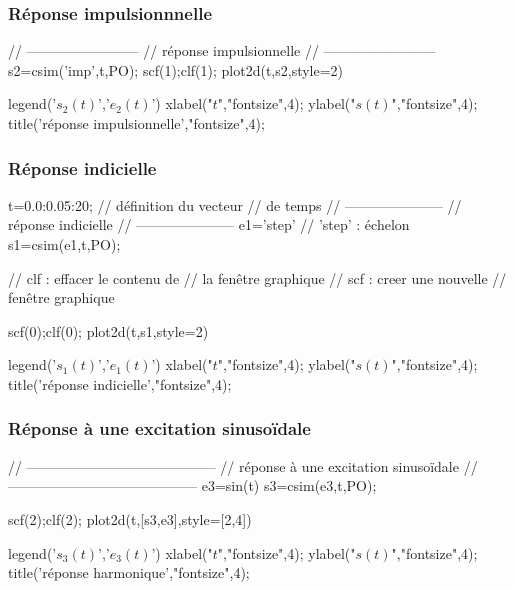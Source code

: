 \subsubsection{Réponse impulsionnnelle}
\begin{Scilabcode}
// ------------------------
// réponse impulsionnelle
// ------------------------
s2=csim('imp',t,PO);   
scf(1);clf(1);
plot2d(t,s2,style=2)

legend('$s_2(t)$','$e_2(t)$')
xlabel("$t$","fontsize",4);
ylabel("$s(t)$","fontsize",4); 
title('réponse impulsionnelle',"fontsize",4);
\end{Scilabcode}
\subsubsection{Réponse indicielle}
\begin{Scilabcode}

t=0.0:0.05:20;                  // définition du vecteur 
                                // de temps
// ---------------------
//  réponse indicielle
// ---------------------
e1='step'                       // 'step' : échelon
s1=csim(e1,t,PO);    

// clf : effacer le contenu de
// la fenêtre graphique
// scf : creer une nouvelle 
// fenêtre graphique

scf(0);clf(0);
plot2d(t,s1,style=2)

legend('$s_1(t)$','$e_1(t)$')
xlabel("$t$","fontsize",4);
ylabel("$s(t)$","fontsize",4); 
title('réponse indicielle',"fontsize",4);
\end{Scilabcode}


\subsubsection{Réponse à une excitation sinuso\"idale}
\begin{Scilabcode}
// -----------------------------------------
// réponse à une excitation sinuso\"idale 
// -----------------------------------------
e3=sin(t)
s3=csim(e3,t,PO);

scf(2);clf(2);
plot2d(t,[s3,e3],style=[2,4])

legend('$s_3(t)$','$e_3(t)$')
xlabel("$t$","fontsize",4);
ylabel("$s(t)$","fontsize",4); 
title('réponse harmonique',"fontsize",4);
\end{Scilabcode}

